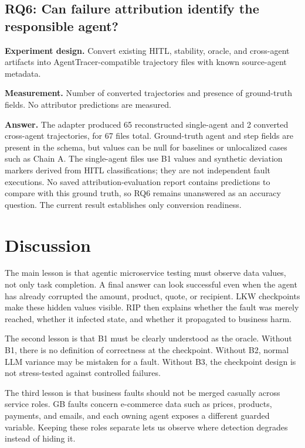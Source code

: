 \documentclass[sigconf,review,anonymous,balance=false]{acmart}
\begin{document}
\subsection{RQ6: Can failure attribution identify the responsible agent?}

\textbf{Experiment design.} Convert existing HITL, stability, oracle, and
cross-agent artifacts into AgentTracer-compatible trajectory files with known
source-agent metadata.

\textbf{Measurement.} Number of converted trajectories and presence of
ground-truth fields. No attributor predictions are measured.

\textbf{Answer.} The adapter produced 65 reconstructed single-agent and 2
converted cross-agent trajectories, for 67 files total. Ground-truth agent and
step fields are present in the schema, but values can be null for baselines or
unlocalized cases such as Chain A. The single-agent files use B1 values and
synthetic deviation markers derived from HITL classifications; they are not
independent fault executions. No saved attribution-evaluation report contains
predictions to compare with this ground truth, so RQ6 remains unanswered as an
accuracy question. The current result establishes only conversion readiness.

\clearpage

\section{Discussion}

The main lesson is that agentic microservice testing must observe data values,
not only task completion. A final answer can look successful even when the
agent has already corrupted the amount, product, quote, or recipient. LKW
checkpoints make these hidden values visible. RIP then explains whether the
fault was merely reached, whether it infected state, and whether it propagated
to business harm.

The second lesson is that B1 must be clearly understood as the oracle. Without
B1, there is no definition of correctness at the checkpoint. Without B2, normal
LLM variance may be mistaken for a fault. Without B3, the checkpoint design is
not stress-tested against controlled failures.

The third lesson is that business faults should not be merged casually across
service roles. GB faults concern e-commerce data such as prices, products,
payments, and emails, and each owning agent exposes a different guarded
variable. Keeping these roles separate lets us observe where detection
degrades instead of hiding it.
\end{document}
